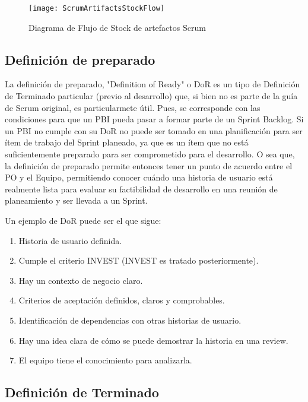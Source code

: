 \begin{figure}[h]
  \centering
  \texttt{[image: ScrumArtifactsStockFlow]}
  \caption{Diagrama de Flujo de Stock de artefactos Scrum}
  \centering
  \label{fig:ScrumArtifactsStockFlow} 
\end{figure}

\subsection{Definición de preparado}

La definición de preparado, "Definition of Ready" o DoR es un tipo de Definición de Terminado particular (previo al desarrollo) que, si bien no es parte de la guía de Scrum original, es particularmete útil. Pues, se corresponde con las condiciones para que un PBI pueda pasar a formar parte de un Sprint Backlog. Si un PBI no cumple con su DoR no puede ser tomado en una planificación para ser ítem de trabajo del Sprint planeado, ya que es un ítem que no está suficientemente preparado para ser comprometido para el desarrollo. O sea que, la definición de preparado permite entonces tener un punto de acuerdo entre el PO y el Equipo, permitiendo conocer cuándo una historia de usuario está realmente lista para evaluar su factibilidad de desarrollo en una reunión de planeamiento y ser llevada a un Sprint.

Un ejemplo de DoR puede ser el que sigue:

\begin{enumerate}
\item{Historia de usuario definida.}
\item{Cumple el criterio INVEST (INVEST es tratado posteriormente).}
\item{Hay un contexto de negocio claro.}
\item{Criterios de aceptación definidos, claros y comprobables.}
\item{Identificación de dependencias con otras historias de usuario.}
\item{Hay una idea clara de cómo se puede demostrar la historia en una review.}
\item{El equipo tiene el conocimiento para analizarla.}
\end{enumerate}

\subsection{Definición de Terminado}

